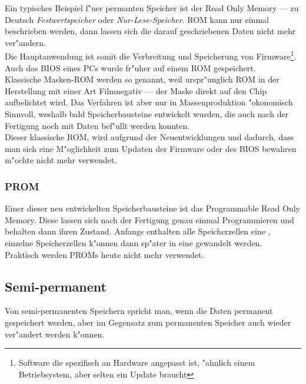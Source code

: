 					Ein typisches Beispiel f"uer permanten Speicher ist der \glqq Read Only Memory\grqq{} --- zu Deutsch \textit{Festwertspeicher} oder \textit{Nur-Lese-Speicher}. ROM kann nur einmal beschrieben werden, dann lassen sich die darauf geschriebenen Daten nicht mehr ver"andern. 
					\\
					Die Hauptanwendung ist somit die Verbreitung und Speicherung von Firmware\footnote{Software die spezifisch an Hardware angepasst ist, "ahnlich einem Betriebsystem, aber selten ein Update braucht}. Auch das BIOS eines PCs wurde fr"uher auf einem ROM gespeichert.
					\\
					Klassische Masken-ROM werden so genannt, weil urspr"unglich ROM in der Herstellung mit einer Art Filmnegativ --- der \glqq Maske\grqq{} direkt auf den Chip aufbelichtet wird. Das Verfahren ist aber nur in Massenproduktion "okonomisch Sinnvoll, weshalb bald Speicherbausteine entwickelt wurden, die auch nach der Fertigung noch mit Daten bef"ullt werden konnten.
					\\
					Dieser klassische ROM, wird aufgrund der Neuentwicklungen und dadurch, dass man sich eine M"oglichkeit zum Updaten der Firmware oder des BIOS bewahren m"ochte nicht mehr verwendet.
				
				\subsubsection{PROM}
				\label{ch:Technisch:sec:Elektronische Speicherung:sub:Fl"uchtig:subsub:PROM}
				
					Einer dieser neu entwickelten Speicherbausteine ist das \glqq Programmable Read Only Memory\grqq{}. Diese lassen sich nach der Fertigung genau einmal Programmieren und behalten dann ihren Zustand. Anfangs enthalten alle Speicherzellen eine \grqq{}, einzelne Speicherzellen k"onnen dann sp"ater in eine \grqq{} gewandelt werden.
					\\
					Praktisch werden PROMs heute nicht mehr verwendet. 
            
        \subsection{Semi-permanent}
        \label{ch:Technisch:sec:Elektronische Speicherung:sub:Semi-permanent}
        
            Von semi-permanenten Speichern spricht man, wenn die Daten permanent gespeichert werden, aber im Gegensatz zum permanenten Speicher auch wieder ver"andert werden k"onnen. 
			
